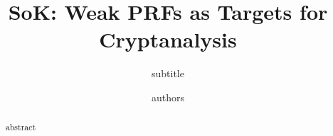 \documentclass[journal=tosc,submission]{iacrtrans}
\author{authors}
\institute{institutions}
\title{SoK: Weak PRFs as Targets for Cryptanalysis}
\subtitle{subtitle}
\begin{document}
\maketitle


\begin{abstract}
  abstract
\end{abstract}

\vfill
\tableofcontents
\newpage











\end{document}
